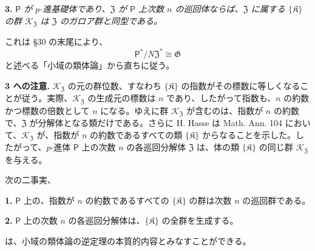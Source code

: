 \noindent\textbf{3.} \emph{\(\mathsf P\) が \(p\)-進基礎体であり、\(\mathfrak Z\) が \(\mathsf P\) 上次数 \(n\) の巡回体ならば、\(\mathfrak Z\) に属する \(\{\mathfrak K\}\) の群 \(\mathscr K_{\mathfrak Z}\) は \(\mathfrak Z\) のガロア群と同型である。}

これは \S 30 の末尾により、
\[
\mathsf P^*/N\mathfrak Z^*\cong\mathfrak G
\]
と述べる「小域の類体論」から直ちに従う。

\noindent\textbf{3 への注意.} \(\mathscr K_{\mathfrak Z}\) の元の群位数、すなわち \(\{\mathfrak K\}\) の指数がその標数に等しくなることが従う。実際、\(\mathscr K_{\mathfrak Z}\) の生成元の標数は \(n\) であり、したがって指数も、\(n\) の約数かつ標数の倍数として \(n\) になる。ゆえに群 \(\mathscr K_{\mathfrak Z}\) が含むのは、指数が \(n\) の約数で、\(\mathfrak Z\) が分解体となる類だけである。さらに H. Hasse は Math. Ann. 104 において、\(\mathscr K_{\mathfrak Z}\) が、指数が \(n\) の約数であるすべての類 \(\{\mathfrak K\}\) からなることを示した。したがって、\(p\)-進体 \(\mathsf P\) 上の次数 \(n\) の各巡回分解体 \(\mathfrak Z\) は、体の類 \(\{\mathfrak K\}\) の同じ群 \(\mathscr K_{\mathfrak Z}\) を与える。

次の二事実、

\noindent\textbf{1.} \(\mathsf P\) 上の、指数が \(n\) の約数であるすべての \(\{\mathfrak K\}\) の群は次数 \(n\) の巡回群である。

\noindent\textbf{2.} \(\mathsf P\) 上の次数 \(n\) の各巡回分解体は、\(\{\mathfrak K\}\) の全群を生成する。

は、小域の類体論の逆定理の本質的内容とみなすことができる。
